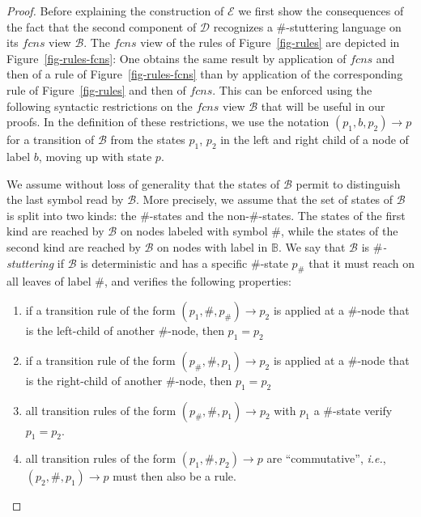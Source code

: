 \documentclass{CSML}
\newcommand\ra{\ensuremath{\rightarrow}}
\newcommand\B{\mathbb{B}}
\newcommand\Ba{\mathcal{B}}
\newcommand\Da{\mathcal{D}}
\newcommand\Ea{\mathcal{E}}
\newcommand\fcns{\ensuremath{\mathit{fcns}}\xspace}
\begin{document}
\begin{proof}
\medskip

Before explaining the construction of $\Ea$ we first show the consequences of
the fact that the second component of $\Da$ recognizes a $\#$-stuttering language on its \fcns view $\Ba$.
The \fcns view of the rules of Figure~\ref{fig-rules} are depicted in
Figure~\ref{fig-rules-fcns}: One obtains the same result by application of \fcns and then of a rule of Figure~\ref{fig-rules-fcns} 
than by application of the corresponding rule of Figure~\ref{fig-rules} and then of \fcns. 
This can be enforced using the following syntactic restrictions on the \fcns view $\Ba$ that will be useful in our proofs.
In the definition of these restrictions, 
we use the notation $(p_1,b,p_2) \ra p$ 
for a transition of $\Ba$ from the states $p_1$, $p_2$ 
in the left and right child of a node of label $b$, moving up with state $p$.


We assume without loss of generality that the states of $\Ba$ permit to
distinguish the last symbol read by $\Ba$.  More precisely, we assume that the
set of states of $\Ba$ is split into two kinds: the $\#$-states and the
non-$\#$-states.  The states of the first kind are reached by $\Ba$ on nodes
labeled with symbol $\#$, while the states of the second kind are reached by
$\Ba$ on nodes with label in $\B$.  We say that $\Ba$ is
\emph{$\#$-stuttering} if $\Ba$ is deterministic and has a specific $\#$-state
$p_\#$ that it must reach on all leaves of label $\#$, and verifies the
following properties:
\begin{enumerate} 
\item if a transition rule of the form $(p_1, \#, p_\#) \to p_2$ 
is applied at a $\#$-node that is the left-child of another $\#$-node, then $p_1=p_2$
\item if a transition rule of the form $(p_\#, \#, p_1) \to p_2$ is applied at a $\#$-node that is the right-child of another $\#$-node, then $p_1=p_2$
\item all transition rules of the form $(p_\#, \#, p_1) \to p_2$ with $p_1$ a $\#$-state
  verify $p_1=p_2$.
\item \label{it-commutativity}
 all transition rules of the form $(p_1, \#, p_2) \to p$ are ``commutative'',
  \textit{i.e.}, $(p_2, \#, p_1) \to p$ must then also be a rule.
\end{enumerate}



\end{proof}
\end{document}
